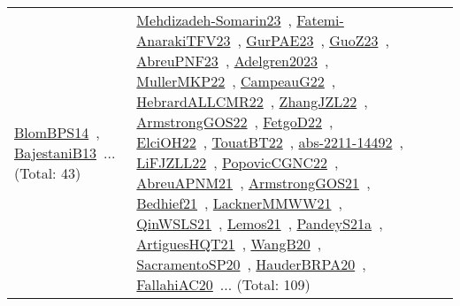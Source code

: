 {\begin{longtable}{lp{3cm}>{\raggedright\arraybackslash}p{6cm}>{\raggedright\arraybackslash}p{6cm}>{\raggedright\arraybackslash}p{8cm}}
\href{works/BlomBPS14.pdf}{BlomBPS14}~\cite{BlomBPS14}, \href{works/BajestaniB13.pdf}{BajestaniB13}~\cite{BajestaniB13}... (Total: 43) & \href{works/Mehdizadeh-Somarin23.pdf}{Mehdizadeh-Somarin23}~\cite{Mehdizadeh-Somarin23}, \href{works/Fatemi-AnarakiTFV23.pdf}{Fatemi-AnarakiTFV23}~\cite{Fatemi-AnarakiTFV23}, \href{works/GurPAE23.pdf}{GurPAE23}~\cite{GurPAE23}, \href{works/GuoZ23.pdf}{GuoZ23}~\cite{GuoZ23}, \href{works/AbreuPNF23.pdf}{AbreuPNF23}~\cite{AbreuPNF23}, \href{works/Adelgren2023.pdf}{Adelgren2023}~\cite{Adelgren2023}, \href{works/MullerMKP22.pdf}{MullerMKP22}~\cite{MullerMKP22}, \href{works/CampeauG22.pdf}{CampeauG22}~\cite{CampeauG22}, \href{works/HebrardALLCMR22.pdf}{HebrardALLCMR22}~\cite{HebrardALLCMR22}, \href{works/ZhangJZL22.pdf}{ZhangJZL22}~\cite{ZhangJZL22}, \href{works/ArmstrongGOS22.pdf}{ArmstrongGOS22}~\cite{ArmstrongGOS22}, \href{works/FetgoD22.pdf}{FetgoD22}~\cite{FetgoD22}, \href{works/ElciOH22.pdf}{ElciOH22}~\cite{ElciOH22}, \href{works/TouatBT22.pdf}{TouatBT22}~\cite{TouatBT22}, \href{works/abs-2211-14492.pdf}{abs-2211-14492}~\cite{abs-2211-14492}, \href{works/LiFJZLL22.pdf}{LiFJZLL22}~\cite{LiFJZLL22}, \href{works/PopovicCGNC22.pdf}{PopovicCGNC22}~\cite{PopovicCGNC22}, \href{works/AbreuAPNM21.pdf}{AbreuAPNM21}~\cite{AbreuAPNM21}, \href{works/ArmstrongGOS21.pdf}{ArmstrongGOS21}~\cite{ArmstrongGOS21}, \href{works/Bedhief21.pdf}{Bedhief21}~\cite{Bedhief21}, \href{works/LacknerMMWW21.pdf}{LacknerMMWW21}~\cite{LacknerMMWW21}, \href{works/QinWSLS21.pdf}{QinWSLS21}~\cite{QinWSLS21}, \href{works/Lemos21.pdf}{Lemos21}~\cite{Lemos21}, \href{works/PandeyS21a.pdf}{PandeyS21a}~\cite{PandeyS21a}, \href{works/ArtiguesHQT21.pdf}{ArtiguesHQT21}~\cite{ArtiguesHQT21}, \href{works/WangB20.pdf}{WangB20}~\cite{WangB20}, \href{works/SacramentoSP20.pdf}{SacramentoSP20}~\cite{SacramentoSP20}, \href{works/HauderBRPA20.pdf}{HauderBRPA20}~\cite{HauderBRPA20}, \href{works/FallahiAC20.pdf}{FallahiAC20}~\cite{FallahiAC20}... (Total: 109)\\

\end{longtable}}

